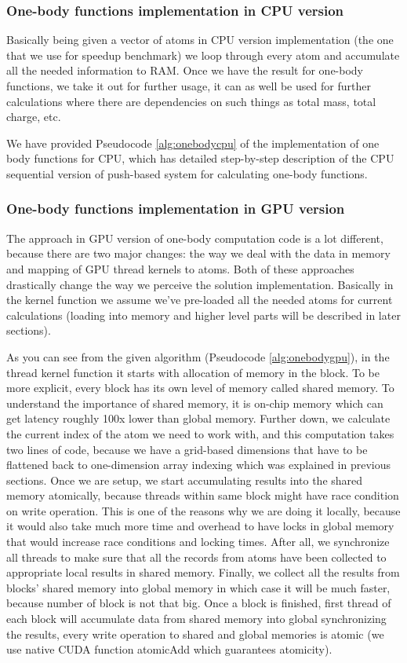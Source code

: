 \documentclass[11pt,a4paper]{report}
\begin{document}
\subsubsection{One-body functions implementation in CPU version}

Basically being given a vector of atoms in CPU version implementation (the one that we use for speedup benchmark) we loop through every atom and accumulate all the needed information to RAM. Once we have the result for one-body functions, we take it out for further usage, it can as well be used for further calculations where there are dependencies on such things as total mass, total charge, etc.

We have provided Pseudocode \ref{alg:onebodycpu} of the implementation of one body functions for CPU, which has detailed step-by-step description of the CPU sequential version of push-based system for calculating one-body functions.

\subsubsection{One-body functions implementation in GPU version}

The approach in GPU version of one-body computation code is a lot different, because there are two major changes: the way we deal with the data in memory and mapping of GPU thread kernels to atoms. Both of these approaches drastically change the way we perceive the solution implementation. Basically in the kernel function we assume we've pre-loaded all the needed atoms for current calculations (loading into memory and higher level parts will be described in later sections).

As you can see from the given algorithm (Pseudocode \ref{alg:onebodygpu}), in the thread kernel function it starts with allocation of memory in the block. To be more explicit, every block has its own level of memory called shared memory. To understand the importance of shared memory, it is on-chip memory which can get latency roughly 100x lower than global memory. Further down, we calculate the current index of the atom we need to work with, and this computation takes two lines of code, because we have a grid-based dimensions that have to be flattened back to one-dimension array indexing which was explained in previous sections. Once we are setup, we start accumulating results into the shared memory atomically, because threads within same block might have race condition on write operation. This is one of the reasons why we are doing it locally, because it would also take much more time and overhead to have locks in global memory that would increase race conditions and locking times. After all, we synchronize all threads to make sure that all the records from atoms have been collected to appropriate local results in shared memory. Finally, we collect all the results from blocks' shared memory into global memory in which case it will be much faster, because number of block is not that big. Once a block is finished, first thread of each block will accumulate data from shared memory into global synchronizing the results, every write operation to shared and global memories is atomic (we use native CUDA function atomicAdd which guarantees atomicity). 
\end{document}
